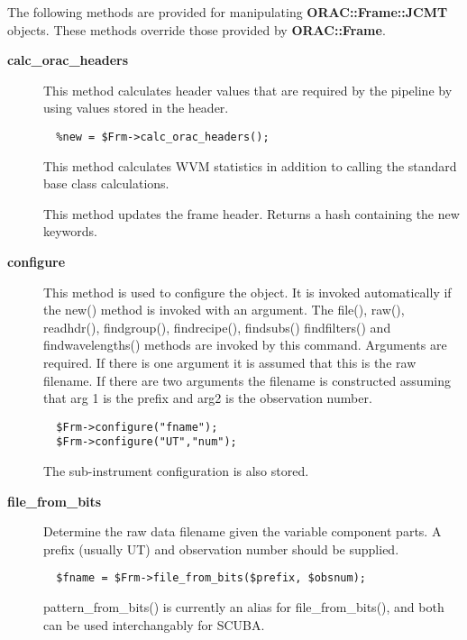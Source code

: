 \begin{description}
The following methods are provided for manipulating
\textbf{ORAC::Frame::JCMT} objects. These methods override those
provided by \textbf{ORAC::Frame}.

\begin{description}

\item[{\textbf{calc\_orac\_headers}}] \mbox{}

This method calculates header values that are required by the
pipeline by using values stored in the header.

\begin{verbatim}
  %new = $Frm->calc_orac_headers();
\end{verbatim}


This method calculates WVM statistics in addition to calling
the standard base class calculations.



This method updates the frame header.
Returns a hash containing the new keywords.


\item[{\textbf{configure}}] \mbox{}

This method is used to configure the object. It is invoked
automatically if the new() method is invoked with an argument. The
file(), raw(), readhdr(), findgroup(), findrecipe(), findsubs()
findfilters() and findwavelengths() methods are
invoked by this command. Arguments are required.
If there is one argument it is assumed that this is the
raw filename. If there are two arguments the filename is
constructed assuming that arg 1 is the prefix and arg2 is the
observation number.

\begin{verbatim}
  $Frm->configure("fname");
  $Frm->configure("UT","num");
\end{verbatim}


The sub-instrument configuration is also stored.


\item[{\textbf{file\_from\_bits}}] \mbox{}

Determine the raw data filename given the variable component
parts. A prefix (usually UT) and observation number should
be supplied.

\begin{verbatim}
  $fname = $Frm->file_from_bits($prefix, $obsnum);
\end{verbatim}


pattern\_from\_bits() is currently an alias for file\_from\_bits(),
and both can be used interchangably for SCUBA.



\end{description}
\end{description}
